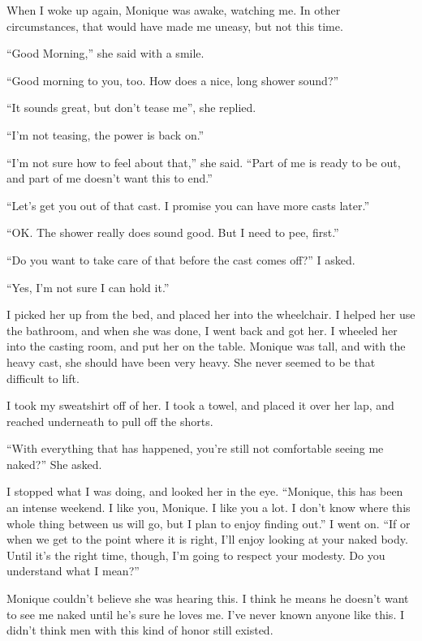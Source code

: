 When I woke up again, Monique was awake, watching me. In other circumstances, that would
have made me uneasy, but not this time.

``Good Morning,'' she said with a smile.

``Good morning to you, too. How does a nice, long shower sound?''

``It sounds great, but don't tease me'', she replied.

``I'm not teasing, the power is back on.''

``I'm not sure how to feel about that,'' she said. ``Part of me is ready to be out, and
part of me doesn't want this to end.''

``Let's get you out of that cast. I promise you can have more casts later.''

``OK. The shower really does sound good. But I need to pee, first.''

``Do you want to take care of that before the cast comes off?'' I asked.

``Yes, I'm not sure I can hold it.''

I picked her up from the bed, and placed her into the wheelchair. I helped her use the
bathroom, and when she was done, I went back and got her. I wheeled her into the casting room,
and put her on the table. Monique was tall, and with the heavy cast, she should have been very
heavy. She never seemed to be that difficult to lift.

I took my sweatshirt off of her. I took a towel, and placed it over her lap, and reached
underneath to pull off the shorts.

``With everything that has happened, you're still not comfortable seeing me naked?'' She
asked.

I stopped what I was doing, and looked her in the eye. ``Monique, this has been an intense
weekend. I like you, Monique. I like you a lot. I don't know where this whole thing between us
will go, but I plan to enjoy finding out.'' I went on. ``If or when we get to the point where it
is right, I'll enjoy looking at your naked body. Until it's the right time, though, I'm going to
respect your modesty. Do you understand what I mean?''

\begin{thought}
Monique couldn't believe she was hearing this. I think he means he doesn't want to see me
naked until he's sure he loves me. I've never known anyone like this. I didn't think men with
this kind of honor still existed.
\end{thought}

